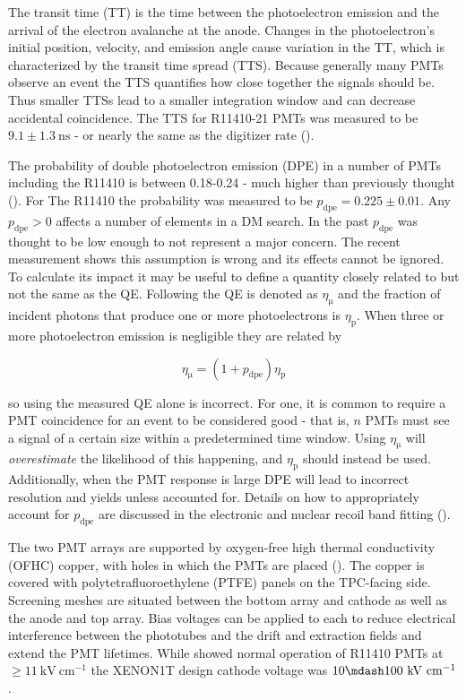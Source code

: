 The transit time (TT) is the time between the photoelectron emission and the arrival of the electron avalanche at the anode.  Changes in
the photoelectron's initial position, velocity, and emission angle cause variation in the TT, which is characterized by the
transit time spread (TTS).  Because generally many PMTs observe an event the TTS quantifies how close together the signals should
be.  Thus
smaller TTSs lead to a smaller integration window and can decrease accidental coincidence.  The TTS for R11410-21 PMTs was measured to be
$9.1 \pm 1.3\ \mathrm{ns}$ - or nearly the same as the digitizer rate ().

The probability of double photoelectron emission (DPE) in a number of PMTs including the R11410 is between 0.18-0.24 - much higher
than previously thought ().  For The R11410 the probability was measured to be
$p_{\mathrm{dpe}} = 0.225 \pm 0.01$.  Any $p_{\mathrm{dpe}} > 0$ affects a number of elements in a DM
search.  In the past $p_{\mathrm{dpe}}$ was thought to be low enough to not represent a major concern.  The recent measurement shows this
assumption is wrong and its effects cannot be ignored.  To calculate its impact it may be useful to define a quantity closely
related to but not the same as the QE.  Following  the QE is denoted as $\eta_{\mathrm{\mu}}$ and the fraction of
incident photons that produce one or more photoelectrons is $\eta_{\mathrm{p}}$.  When three or more photoelectron emission is negligible
they are related by

\begin{equation}
\eta_{\mathrm{\mu}} = (1 + p_{\mathrm{dpe}}) \eta_{\mathrm{p}}
\label{eq:xenon1t_pmts_dpe}
\end{equation}

\noindent so using the measured QE alone is incorrect.  For one, it is common to require a PMT coincidence for an event to
be considered good - that is, $n$ PMTs must see a signal of a certain size within a predetermined time window.  Using
$\eta_{\mathrm{\mu}}$ will
\textit{overestimate} the likelihood of this happening, and $\eta_{\mathrm{p}}$ should instead be used.  Additionally, when the PMT
response is large DPE will lead to incorrect resolution and yields unless accounted for.  Details on how to appropriately
account for $p_{\mathrm{dpe}}$ are discussed in the electronic and nuclear recoil band fitting
().

The two PMT arrays are supported by oxygen-free high thermal conductivity (OFHC) copper, with holes in which the PMTs are placed
().  The
copper is covered with polytetrafluoroethylene (PTFE) panels on the TPC-facing side.  Screening meshes are situated between the bottom
array and cathode as well as the anode and top array.  Bias voltages can be applied to each to reduce electrical interference between the
phototubes and the drift and extraction fields and extend the PMT lifetimes.  While  showed normal operation of R11410
PMTs at $\geq 11\ \mathrm{kV\ cm^{-1}}$ the XENON1T design cathode voltage was $10 \mdash 100\ \mathrm{kV\ cm^{-1}}$.

